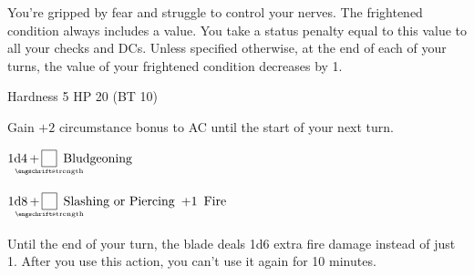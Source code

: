 \documentclass[paper=63mm:88mm, DIV=21, fontsize=7.5pt]{scrartcl}
\begin{document}
You're gripped by fear and struggle to control your nerves.
The frightened condition always includes a value.
You take a status penalty equal to this value to all your checks and DCs.
Unless specified otherwise, at the end of each of your turns, the value of your frightened condition decreases by 1.



Hardness 5
HP 20 (BT 10)



Gain \(+2\) circumstance bonus to AC until the start of your next turn.




\(\operatorname{1d4} + \FormulaVariable{strength}{\phantom{1}} \DamageType{Bludgeoning}\)






\(\operatorname{1d8} + \FormulaVariable{strength}{\phantom{1}} \DamageType{Slashing or Piercing} + 1 \DamageType{Fire}\)



Until the end of your turn, the blade deals 1d6 extra fire damage instead of just 1. After you use this action, you can't use it again for 10 minutes.

\vfill

\end{document}
